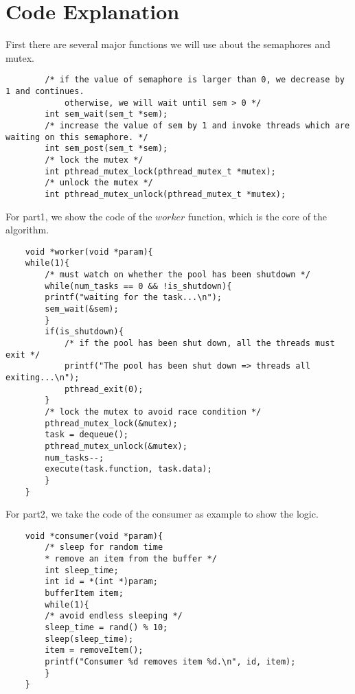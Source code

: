 \documentclass[12pt]{extarticle}
\newcommand{\<}{\langle}
\renewcommand{\>}{\rangle}
\theoremstyle{definition}
\begin{document}
	\section{Code Explanation}
	First there are several major functions we will use about the semaphores and mutex.
	\begin{lstlisting}
		/* if the value of semaphore is larger than 0, we decrease by 1 and continues.
			otherwise, we will wait until sem > 0 */
		int sem_wait(sem_t *sem);
		/* increase the value of sem by 1 and invoke threads which are waiting on this semaphore. */
		int sem_post(sem_t *sem);
		/* lock the mutex */
		int pthread_mutex_lock(pthread_mutex_t *mutex);
		/* unlock the mutex */
		int pthread_mutex_unlock(pthread_mutex_t *mutex);
	\end{lstlisting}
	For part1, we show the code of the $worker$ function, which is the core of the algorithm.
	\begin{lstlisting}
	void *worker(void *param){
	while(1){
		/* must watch on whether the pool has been shutdown */
		while(num_tasks == 0 && !is_shutdown){
		printf("waiting for the task...\n");
		sem_wait(&sem);
		}
		if(is_shutdown){
			/* if the pool has been shut down, all the threads must exit */
			printf("The pool has been shut down => threads all exiting...\n");
			pthread_exit(0);
		}
		/* lock the mutex to avoid race condition */
		pthread_mutex_lock(&mutex);
		task = dequeue();
		pthread_mutex_unlock(&mutex);
		num_tasks--;
		execute(task.function, task.data);
		}
	}
	\end{lstlisting}
	For part2, we take the code of the consumer as example to show the logic.
	\begin{lstlisting}
	void *consumer(void *param){
		/* sleep for random time
		* remove an item from the buffer */
		int sleep_time;
		int id = *(int *)param;
		bufferItem item;
		while(1){
		/* avoid endless sleeping */
		sleep_time = rand() % 10;
		sleep(sleep_time);
		item = removeItem();
		printf("Consumer %d removes item %d.\n", id, item);
		}
	}
	\end{lstlisting}
\end{document}
